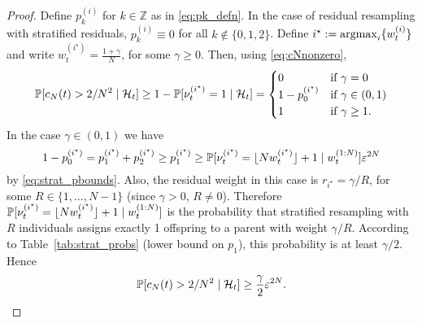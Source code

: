 \begin{proof}
Define $p_k^{(i)}$ for $k\in\mathbb{Z}$ as in \eqref{eq:pk_defn}. In the case of residual resampling with stratified residuals, $p_{k}^{(i)} \equiv 0$ for all $k\notin\{0,1,2\}$. 
Define $i^\star := \argmax_i \{ w_t^{(i)} \}$ and write
$w_t^{(i^\star)} = \frac{1+\gamma}{N}$, for some $\gamma \geq 0$.
Then, using \eqref{eq:cNnonzero}, 
\begin{equation*}
\Prob[ c_N(t) > 2/N^2 \mid \mathcal{H}_t ]
\geq 1- \Prob[ \nu_t^{(i^\star)} =1 \mid \mathcal{H}_t ]
= \begin{cases}
    0 & \text{if } \gamma = 0 \\
    1 - p_0^{(i^\star)} & \text{if } \gamma \in (0,1) \\
    1 & \text{if } \gamma \geq 1 .
\end{cases}
\end{equation*}
In the case $\gamma \in (0,1)$ we have
\begin{equation*}
1 - p_0^{(i^\star)}
= p_1^{(i^\star)} + p_2^{(i^\star)} 
\geq p_1^{(i^\star)} 
\geq \Prob[ \nu_t^{(i^\star)} = \flnw[i^\star] + 1 \mid w_t^{(1:N)} ] \varepsilon^{2N}
\end{equation*}
by \eqref{eq:strat_pbounds}.
Also, the residual weight in this case is $r_{i^\star} = \gamma /R$, for some $R\in\{1, \dots, N-1\}$ (since $\gamma > 0$, $R \neq 0$).
Therefore $\Prob[ \nu_t^{(i^\star)} = \flnw[i^\star] + 1 \mid w_t^{(1:N)} ]$ is the probability that stratified resampling with $R$ individuals assigns exactly 1 offspring to a parent with weight $\gamma /R$. According to Table~\ref{tab:strat_probs} (lower bound on $p_1$), this probability is at least $\gamma /2$.
Hence
\begin{equation*}
\Prob[ c_N(t) > 2/N^2 \mid \mathcal{H}_t ]
\geq \frac{\gamma}{2} \varepsilon^{2N} .
\end{equation*}

\end{proof}
